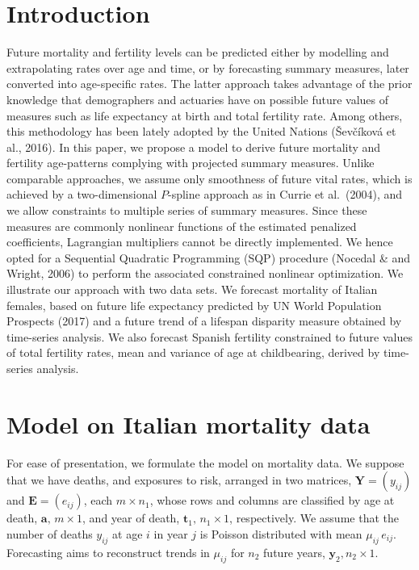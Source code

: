 \documentclass[twoside]{report}
\begin{document}
\section{Introduction}
Future mortality and fertility levels can be predicted either by modelling and extrapolating rates over age and time, or by forecasting summary measures, later converted into age-specific rates. 
The latter approach takes advantage of the prior knowledge that demographers and actuaries have on possible future values of measures such as life expectancy at birth and total fertility rate. Among others, this methodology has been lately adopted by the United Nations (\v{S}ev\v{c}\'ikov\'a et al., 2016). 
In this paper, we propose a model to derive future mortality and fertility age-patterns complying with  projected summary measures. Unlike comparable approaches, we assume only smoothness of future vital rates, which is achieved by a two-dimensional $P$-spline approach as in Currie et al.~(2004), and we allow constraints to multiple series of summary measures. Since these measures are commonly nonlinear functions of the estimated penalized coefficients, Lagrangian multipliers cannot be directly implemented. We hence opted for a Sequential Quadratic Programming (SQP) procedure (Nocedal \& and Wright, 2006) to perform the associated constrained nonlinear optimization.
We illustrate our approach with two data sets. We forecast mortality of Italian females, based on future life expectancy predicted by UN World Population Prospects (2017) and a future trend of a lifespan disparity measure obtained by time-series analysis. We also forecast Spanish fertility constrained to future values of total fertility rates, mean and variance of age at childbearing, derived by time-series analysis.

\section{Model on Italian mortality data}

For ease of presentation, we formulate the model on mortality data. We suppose that we have deaths, and exposures to risk, arranged in two matrices, 
$\bm{Y} = (y_{ij})$ and $\bm{E} = (e_{ij})$, each $m \times n_{1}$, whose rows and columns are classified by age at death, $\bm{a}, \,m \times 1$, and year of death, $\bm{t}_{1}, \,n_{1} \times 1$, respectively.  
We assume that the number of deaths $y_{ij}$ at age $i$ in year $j$ is Poisson distributed with mean $\mu_{ij} \,e_{ij}$. %
Forecasting aims to reconstruct trends in $\mu_{ij}$ for $n_{2}$ future years, $\bm{y}_{2}, n_{2} \times 1$.
\end{document}

